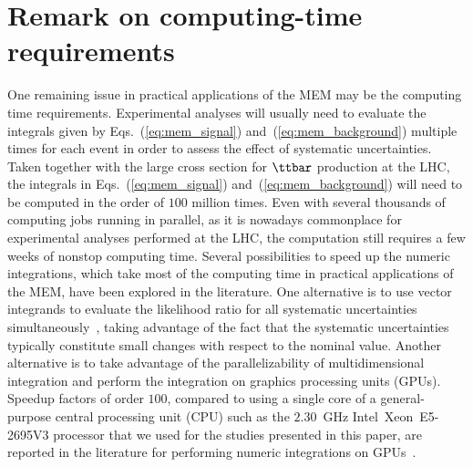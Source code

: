 \section{Remark on computing-time requirements}

One remaining issue in practical applications of the MEM may be the computing time requirements.
Experimental analyses will usually need to evaluate the integrals given by Eqs.~(\ref{eq:mem_signal}) and~(\ref{eq:mem_background})
multiple times for each event in order to assess the effect of systematic uncertainties.
Taken together with the large cross section for $\ttbar$ production at the LHC,
the integrals in Eqs.~(\ref{eq:mem_signal}) and~(\ref{eq:mem_background}) will need to be computed in the order of $100$ million times.
Even with several thousands of computing jobs running in parallel,
as it is nowadays commonplace for experimental analyses performed at the LHC,
the computation still requires a few weeks of nonstop computing time.
Several possibilities to speed up the numeric integrations, which take most of the computing time in practical applications of the MEM,
have been explored in the literature.
One alternative is to use vector integrands to evaluate the likelihood ratio for all systematic uncertainties simultaneously~\cite{CUBA},
taking advantage of the fact that the systematic uncertainties typically constitute small changes with respect to the nominal value.
Another alternative is to take advantage of the parallelizability of multidimensional integration and perform the integration on graphics processing units (GPUs).
Speedup factors of order $100$, compared to using a single core of a general-purpose central processing unit (CPU) 
such as the $2.30$~GHz Intel\TReg~Xeon\TReg~E5-2695V3 processor that we used for the studies presented in this paper,
are reported in the literature for performing numeric integrations on GPUs~\cite{Hagiwara:2009aq,Hagiwara:2009cy,Kanzaki:2010ym,Hagiwara:2013oka,Schouten:2014yza,Grasseau:2015vfa}.
